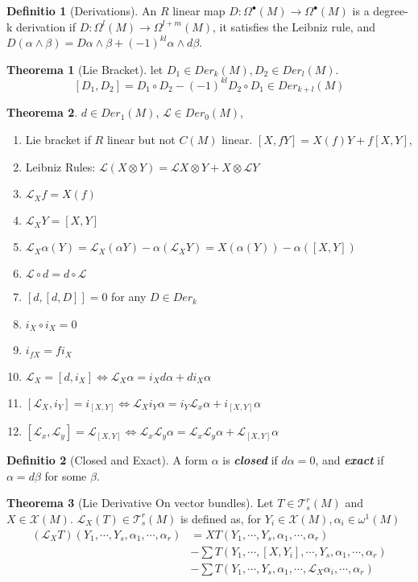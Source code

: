 \documentclass[12pt, a4paper]{article}
\theoremstyle{definition}
\newtheorem{theorem}{Theorema}[section]
\newtheorem{definition}{Definitio}[section]
\theoremstyle{remark}
\renewcommand{\emph}[1]{\textbf{\textit{#1}}}
\newcommand{\dga}{\Omega^{\bullet}}
\renewcommand{\L}{\mathscr{L}}
\begin{document}
\begin{definition}[Derivations]
	An $R$ linear map $D: \dga(M) \rightarrow \dga(M)$ is a degree-k derivation if $D: \Omega^{l}(M) \rightarrow  \Omega^{l+m}(M)$, it satisfies the Leibniz rule, and $D(\alpha \wedge \beta) = D \alpha \wedge \beta + (-1)^{kl} \alpha \wedge d \beta$.
\end{definition}

\begin{theorem}[Lie Bracket]
	let $D_1 \in Der_k(M), D_2 \in Der_l(M)$. 
	$$
	[D_1, D_2] = D_1 \circ D_2 - (-1)^{kl}D_2 \circ D_1 \in Der_{k+l}(M)
	$$
\end{theorem}

\begin{theorem}
	$d \in Der_1(M)$, $\mathscr{L} \in Der_0(M)$, 
	\begin{enumerate}
		\item Lie bracket if $R$ linear but not $C(M)$ linear. $[X, fY] = X(f)Y + f[X, Y]$,
		\item Leibniz Rules: $\L(X \otimes Y) = \L X \otimes Y + X \otimes \L Y$
		\item $\L_X f = X(f)$
		\item $\L_XY = [X, Y]$
		\item $\L_X \alpha (Y) = \L_X (\alpha Y) - \alpha(\L_{X}Y) = X(\alpha(Y)) - \alpha([X,Y])$
		\item $\L \circ d = d \circ \L$
		\item $[d,[d, D]] = 0$ for any $D \in Der_k$
		\item $i_X \circ i_X = 0$
		\item $i_{fX} = fi_X $
		\item $\L_X = [d, i_X] \iff \L_X \alpha = i_X d \alpha + di_X \alpha$
		\item $[\L_X, i_Y] = i_{[X, Y]} \iff \L_X i_Y \alpha = i_Y \L_x \alpha + i_{[X, Y]} \alpha$
		\item $[\L_x, \L_y] = \L_{[X, Y]} \iff  \L_x \L_y  \alpha= \L_x \L_y \alpha +  \L_{[X, Y]} \alpha $
	\end{enumerate}
\end{theorem}
\begin{definition}[Closed and Exact]
	A form $\alpha$ is \emph{closed} if $d \alpha = 0$, and \emph{exact} if $\alpha = d \beta$ for some $\beta$.
\end{definition}

\begin{theorem}[Lie Derivative On vector bundles]
	Let $T \in \mathscr{T}^r_s(M)$ and $X \in \mathscr{X}(M)$.
	$\L_X(T) \in \mathscr{T}^r_s(M)$ is defined as, for $Y_i \in \mathscr{X}(M), \alpha_i \in \omega^1(M)$ 
	\begin{equation}
		\begin{split}
			(\L_XT)(Y_1, \cdots, Y_s, \alpha_1, \cdots, \alpha_r) &= XT(Y_1, \cdots, Y_s, \alpha_1, \cdots, \alpha_r) \\ 
			&- \sum T(Y_1, \cdots, [X, Y_i], \cdots, Y_s, \alpha_1, \cdots, \alpha_r) \\ 
			&- \sum T(Y_1, \cdots, Y_s, \alpha_1, \cdots, \L_X\alpha_i, \cdots, \alpha_r)
		\end{split}
	\end{equation}
\end{theorem}
\end{document}
